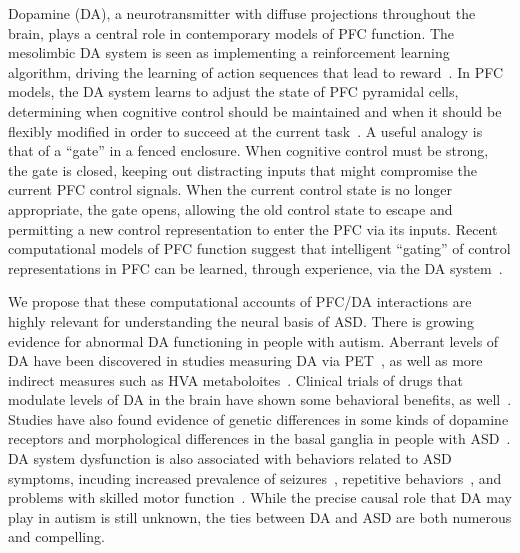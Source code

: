 Dopamine (DA), a neurotransmitter with diffuse projections throughout the brain, plays a central role in contemporary models of PFC function. The mesolimbic DA system is seen as implementing a reinforcement learning algorithm, driving the learning of action sequences that lead to reward~\cite{MontaguePR:1996:Dopamine,BartoAG:1994:TDLearning}. In PFC models, the DA system learns to adjust the state of PFC pyramidal cells, determining when cognitive control should be maintained and when it should be flexibly modified in order to succeed at the current task~\cite{BraverTS:2000:Control}. A useful analogy is that of a ``gate'' in a fenced enclosure. When cognitive control must be strong, the gate is closed, keeping out distracting inputs that might compromise the current PFC control signals. When the current control state is no longer appropriate, the gate opens, allowing the old control state to escape and permitting a new control representation to enter the PFC via its inputs.  Recent computational models of PFC function suggest that intelligent ``gating'' of control representations in PFC can be learned, through experience, via the DA system~\cite{OReillyRC:2002:IDED}. 

We propose that these computational accounts of PFC/DA interactions are highly relevant for understanding the neural basis of ASD. There is growing evidence for abnormal DA functioning in people with autism. Aberrant levels of DA have been discovered in studies measuring DA via PET~\cite{FernellE:1997:AutismPET}, as well as more indirect measures such as HVA metaboloites~\cite{MartineauJ:1992:AutismDopamine}. Clinical trials of drugs that modulate levels of DA in the brain have shown some behavioral benefits, as well~\cite{PoseyDJ:2000:AutismDopamine}. Studies have also found evidence of genetic differences in some kinds of dopamine receptors and morphological differences in the basal ganglia in people with ASD~\cite{StaalW:2012:DopamineASDGenetics,QuiA:2010:ASDMotor}. DA system dysfunction is also associated with behaviors related to ASD symptoms, incuding increased prevalence of seizures~\cite{TuchmanR:2002:EpilepsyAutism}, repetitive behaviors~\cite{CanalesJJ:2000:Stereotypy}, and problems with skilled motor function~\cite{RinehartNJ:2001:AutismMovement}.
While the precise causal role that DA may play in autism is still unknown, the ties between DA and ASD are both numerous and compelling.

